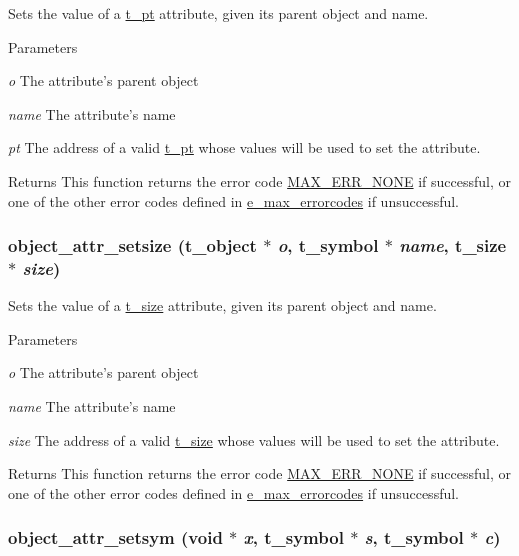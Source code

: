 Sets the value of a \hyperlink{structt__pt}{t\_\-pt} attribute, given its parent object and name. 
\begin{DoxyParams}{Parameters}
\item[{\em o}]The attribute's parent object \item[{\em name}]The attribute's name \item[{\em pt}]The address of a valid \hyperlink{structt__pt}{t\_\-pt} whose values will be used to set the attribute.\end{DoxyParams}
\begin{DoxyReturn}{Returns}
This function returns the error code \hyperlink{group__misc_gga0764dd6c02b76cca7d053ae50555d69da6d22f77fef8b1e1b074cef5d29d935fd}{MAX\_\-ERR\_\-NONE} if successful, or one of the other error codes defined in \hyperlink{group__misc_ga0764dd6c02b76cca7d053ae50555d69d}{e\_\-max\_\-errorcodes} if unsuccessful. 
\end{DoxyReturn}
\hypertarget{group__attr_ga6ac5174d5d897179d20f039c850f538a}{
\subsubsection[{object\_\-attr\_\-setsize}]{ object\_\-attr\_\-setsize ({\bf t\_\-object} $\ast$ {\em o}, \/  {\bf t\_\-symbol} $\ast$ {\em name}, \/  {\bf t\_\-size} $\ast$ {\em size})}}
\label{group__attr_ga6ac5174d5d897179d20f039c850f538a}


Sets the value of a \hyperlink{structt__size}{t\_\-size} attribute, given its parent object and name. 
\begin{DoxyParams}{Parameters}
\item[{\em o}]The attribute's parent object \item[{\em name}]The attribute's name \item[{\em size}]The address of a valid \hyperlink{structt__size}{t\_\-size} whose values will be used to set the attribute.\end{DoxyParams}
\begin{DoxyReturn}{Returns}
This function returns the error code \hyperlink{group__misc_gga0764dd6c02b76cca7d053ae50555d69da6d22f77fef8b1e1b074cef5d29d935fd}{MAX\_\-ERR\_\-NONE} if successful, or one of the other error codes defined in \hyperlink{group__misc_ga0764dd6c02b76cca7d053ae50555d69d}{e\_\-max\_\-errorcodes} if unsuccessful. 
\end{DoxyReturn}
\hypertarget{group__attr_ga642c3b5686b08880194f74c0d5149bcf}{
\subsubsection[{object\_\-attr\_\-setsym}]{ object\_\-attr\_\-setsym (void $\ast$ {\em x}, \/  {\bf t\_\-symbol} $\ast$ {\em s}, \/  {\bf t\_\-symbol} $\ast$ {\em c})}}
\label{group__attr_ga642c3b5686b08880194f74c0d5149bcf}


